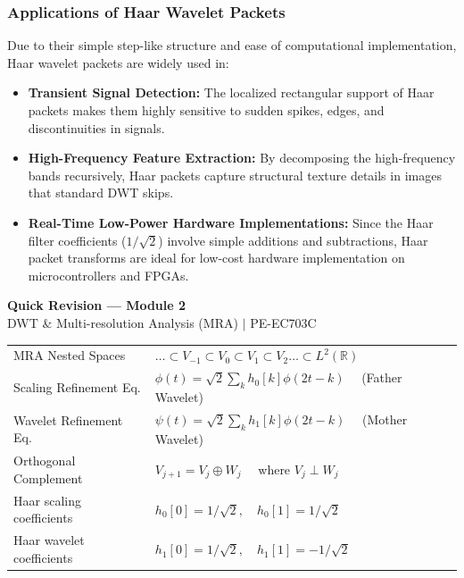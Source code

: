 \documentclass[12pt,a4paper]{article}
\renewcommand{\arraystretch}{1.45}
\begin{document}
\subsubsection{Applications of Haar Wavelet Packets}
Due to their simple step-like structure and ease of computational implementation, Haar wavelet packets are widely used in:
\begin{itemize}[leftmargin=*, itemsep=3.5pt]
  \item \textbf{Transient Signal Detection:} The localized rectangular support of Haar packets makes them highly sensitive to sudden spikes, edges, and discontinuities in signals.
  \item \textbf{High-Frequency Feature Extraction:} By decomposing the high-frequency bands recursively, Haar packets capture structural texture details in images that standard DWT skips.
  \item \textbf{Real-Time Low-Power Hardware Implementations:} Since the Haar filter coefficients ($1/\sqrt{2}$) involve simple additions and subtractions, Haar packet transforms are ideal for low-cost hardware implementation on microcontrollers and FPGAs.
\end{itemize}

\newpage
\begin{center}
  {\large\bfseries\color{myred} Quick Revision --- Module 2}\\[3pt]
  {\small\color{mydark} DWT \& Multi-resolution Analysis (MRA) $|$ PE-EC703C}
\end{center}
\noindent{\color{myred}\rule{\linewidth}{1.2pt}}
\vspace{4pt}

\begin{tcolorbox}[formulabox, title={\textbf{Key DWT \& MRA Equations}}]
\renewcommand{\arraystretch}{1.35}
\begin{tabularx}{\linewidth}{B{5.0cm} X}
MRA Nested Spaces & $\dots \subset V_{-1} \subset V_0 \subset V_1 \subset V_2 \dots \subset L^2(\mathbb{R})$ \\[4pt]
Scaling Refinement Eq. & $\phi(t) = \sqrt{2} \sum_{k} h_0[k] \phi(2t - k) \quad$ (Father Wavelet) \\[4pt]
Wavelet Refinement Eq. & $\psi(t) = \sqrt{2} \sum_{k} h_1[k] \phi(2t - k) \quad$ (Mother Wavelet) \\[4pt]
Orthogonal Complement & $V_{j+1} = V_j \oplus W_j \quad$ where $V_j \perp W_j$ \\[4pt]
Haar scaling coefficients & $h_0[0] = 1/\sqrt{2}, \quad h_0[1] = 1/\sqrt{2}$ \\[4pt]
Haar wavelet coefficients & $h_1[0] = 1/\sqrt{2}, \quad h_1[1] = -1/\sqrt{2}$
\end{tabularx}
\end{tcolorbox}
\end{document}
